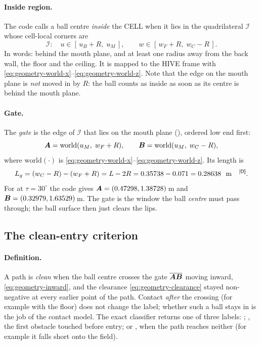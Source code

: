 \paragraph{Inside region.} The code calls a ball centre \emph{inside} the CELL when it lies in the
quadrilateral $\mathcal{I}$ whose cell-local corners are
\begin{equation}
  \mathcal{I}:\quad u \in [\,u_B + R,\; u_M\,], \qquad w \in [\,w_F + R,\; w_C - R\,].
  \label{eq:geometry-inside}
\end{equation}
In words: behind the mouth plane, and at least one radius away from the back wall, the floor and the
ceiling. It is mapped to the HIVE frame with \eqref{eq:geometry-world-x}--\eqref{eq:geometry-world-z}. Note
that the edge on the mouth plane is \emph{not} moved in by $R$: the ball counts as inside as soon as
its centre is behind the mouth plane.

\paragraph{Gate.} The \emph{gate} is the edge of $\mathcal{I}$ that lies on the mouth plane
(), ordered low end first:
\begin{equation}
  \bm{A} = \mathrm{world}(u_M,\; w_F + R), \qquad \bm{B} = \mathrm{world}(u_M,\; w_C - R),
  \label{eq:geometry-gate}
\end{equation}
where $\mathrm{world}(\cdot)$ is \eqref{eq:geometry-world-x}--\eqref{eq:geometry-world-z}. Its length is
\begin{equation}
  L_g = (w_C - R) - (w_F + R) = L - 2R = 0.35738 - 0.071 = 0.28638\ \text{\unit{m}}\text{\derived}.
  \label{eq:geometry-gate-length}
\end{equation}
For  at $\tau = 30^\circ$\confirmed{} the code gives
$\bm{A} = (0.47298, 1.38728)$\,\unit{m}\derived{} and $\bm{B} = (0.32979, 1.63529)$\,\unit{m}\derived.
The gate is the window the ball \emph{centre} must pass through; the ball surface then just clears
the lips.

\subsection{The clean-entry criterion}
\label{sec:geometry-clean}

\paragraph{Definition.} A path is \emph{clean} when the ball centre crosses the gate
$\overline{\bm{A}\bm{B}}$ moving inward, \eqref{eq:geometry-inward}, and the clearance
\eqref{eq:geometry-clearance} stayed non-negative at every earlier point of the path. Contact
\emph{after} the crossing (for example with the floor) does not change the label; whether such a
ball stays in is the job of the contact model. The exact classifier returns one of three labels:
; , the first obstacle touched before entry; or , when the
path reaches neither (for example it falls short onto the field).

